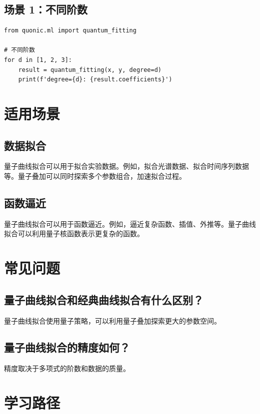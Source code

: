 \documentclass[12pt,a4paper]{article}
\begin{document}
\subsection{场景 1：不同阶数}

\begin{verbatim}
from quonic.ml import quantum_fitting

# 不同阶数
for d in [1, 2, 3]:
    result = quantum_fitting(x, y, degree=d)
    print(f'degree={d}: {result.coefficients}')
\end{verbatim}

\section{适用场景}

\subsection{数据拟合}

量子曲线拟合可以用于拟合实验数据。例如，拟合光谱数据、拟合时间序列数据等。量子叠加可以同时探索多个参数组合，加速拟合过程。

\subsection{函数逼近}

量子曲线拟合可以用于函数逼近。例如，逼近复杂函数、插值、外推等。量子曲线拟合可以利用量子核函数表示更复杂的函数。

\section{常见问题}

\subsection{量子曲线拟合和经典曲线拟合有什么区别？}

量子曲线拟合使用量子策略，可以利用量子叠加探索更大的参数空间。

\subsection{量子曲线拟合的精度如何？}

精度取决于多项式的阶数和数据的质量。

\section{学习路径}
\end{document}
